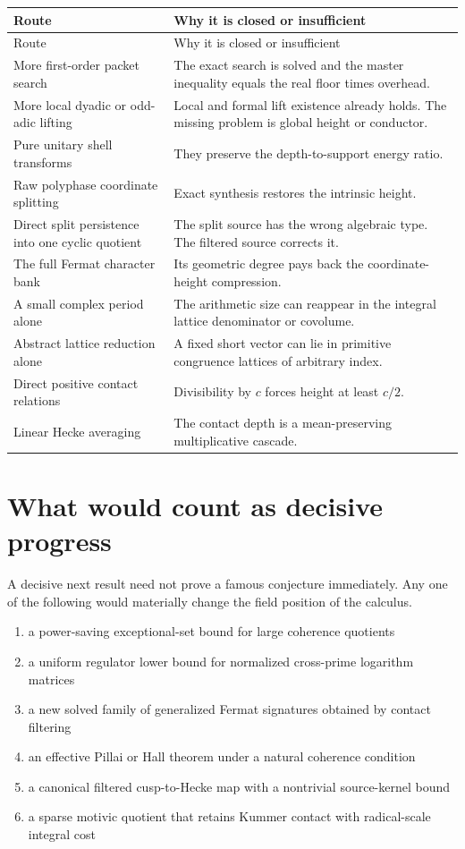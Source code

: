 \begin{longtable}{L{0.30\textwidth}L{0.60\textwidth}}
\toprule
Route & Why it is closed or insufficient\\
\midrule
\endfirsthead
\toprule
Route & Why it is closed or insufficient\\
\midrule
\endhead
More first-order packet search & The exact search is solved and the master inequality equals the real floor times overhead.\\
More local dyadic or odd-adic lifting & Local and formal lift existence already holds. The missing problem is global height or conductor.\\
Pure unitary shell transforms & They preserve the depth-to-support energy ratio.\\
Raw polyphase coordinate splitting & Exact synthesis restores the intrinsic height.\\
Direct split persistence into one cyclic quotient & The split source has the wrong algebraic type. The filtered source corrects it.\\
The full Fermat character bank & Its geometric degree pays back the coordinate-height compression.\\
A small complex period alone & The arithmetic size can reappear in the integral lattice denominator or covolume.\\
Abstract lattice reduction alone & A fixed short vector can lie in primitive congruence lattices of arbitrary index.\\
Direct positive contact relations & Divisibility by $c$ forces height at least $c/2$.\\
Linear Hecke averaging & The contact depth is a mean-preserving multiplicative cascade.\\
\bottomrule
\end{longtable}

\section{What would count as decisive progress}
A decisive next result need not prove a famous conjecture immediately. Any one of the following would materially change the field position of the calculus.

\begin{enumerate}[leftmargin=1.5em]
\item a power-saving exceptional-set bound for large coherence quotients
\item a uniform regulator lower bound for normalized cross-prime logarithm matrices
\item a new solved family of generalized Fermat signatures obtained by contact filtering
\item an effective Pillai or Hall theorem under a natural coherence condition
\item a canonical filtered cusp-to-Hecke map with a nontrivial source-kernel bound
\item a sparse motivic quotient that retains Kummer contact with radical-scale integral cost
\end{enumerate}

